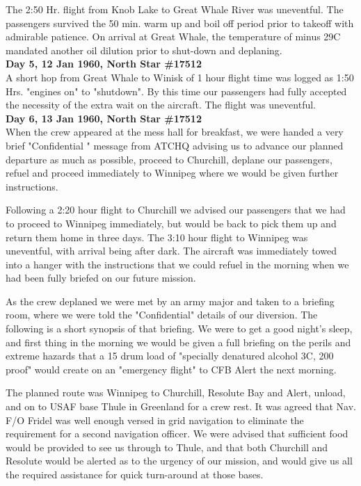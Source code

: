 The 2:50 Hr. flight from Knob Lake to Great Whale River was uneventful.
The passengers survived the 50 min. warm up and boil off period prior
to takeoff with admirable patience. On arrival at Great Whale, the
temperature of minus 29C mandated another oil dilution prior to
shut-down and deplaning.\\

\noindent\textbf{Day 5, 12 Jan 1960, North Star \#17512}\\

A short hop from Great Whale to Winisk of 1 hour flight time was logged
as 1:50 Hrs. "engines on" to "shutdown". By this time our passengers
had fully accepted the necessity of the extra wait on the aircraft. The
flight was uneventful.\\

\noindent\textbf{Day 6, 13 Jan 1960, North Star \#17512}\\

When the crew appeared at the mess hall for breakfast, we were handed a
very brief "Confidential " message from ATCHQ advising us to advance
our planned departure as much as possible, proceed to Churchill,
deplane our passengers, refuel and proceed immediately to Winnipeg
where we would be given further instructions.

Following a 2:20 hour flight to Churchill we advised our passengers
that we had to proceed to Winnipeg immediately, but would be back to
pick them up and return them home in three days. The 3:10 hour flight
to Winnipeg was uneventful, with arrival being after dark. The aircraft
was immediately towed into a hanger with the instructions that we could
refuel in the morning when we had been fully briefed on our future
mission.

As the crew deplaned we were met by an army major and taken to a
briefing room, where we were told the "Confidential" details of our
diversion. The following is a short synopsis of that briefing. We were
to get a good night's sleep, and first thing in the morning we would be
given a full briefing on the perils and extreme hazards that a 15 drum
load of "specially denatured alcohol 3C, 200 proof" would create on an
"emergency flight" to CFB Alert the next morning.

The planned route was Winnipeg to Churchill, Resolute Bay and Alert,
unload, and on to USAF base Thule in Greenland for a crew rest. It was
agreed that Nav. F/O Fridel was well enough versed in grid navigation
to eliminate the requirement for a second navigation officer.  We were
advised that sufficient food would be provided to see us through to
Thule, and that both Churchill and Resolute would be alerted as to the
urgency of our mission, and would give us all the required assistance
for quick turn-around at those bases.\\

